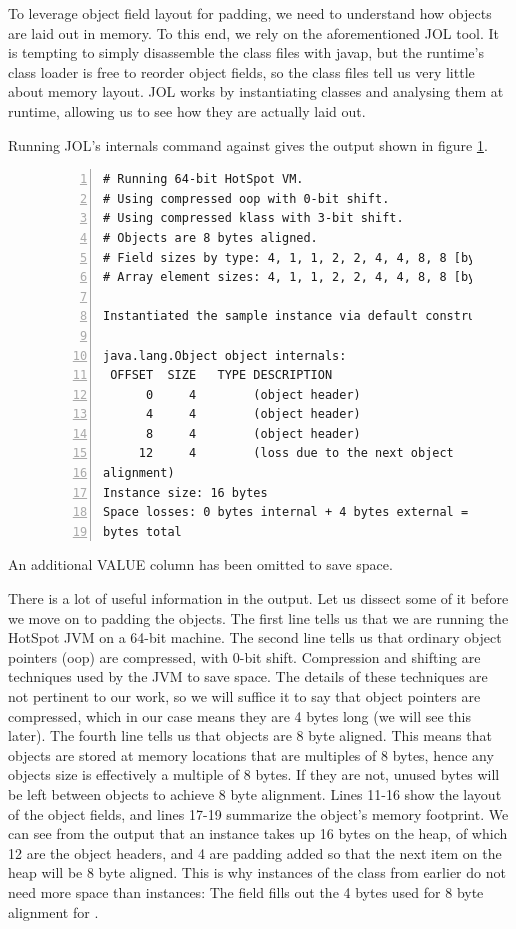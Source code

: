 To leverage object field layout for padding, we need to understand how
objects are laid out in memory. To this end, we rely on the aforementioned
JOL tool. It is tempting to simply disassemble the class files with
javap, but
the runtime's class loader is free to reorder object fields, so the class files
tell us very little about memory layout. JOL works by instantiating classes and
analysing them at runtime, allowing us to see how they are actually laid out.

Running JOL's internals command against  gives the
output shown in figure \ref{jol:object}.

\begin{figure}
\begin{Verbatim}[frame=single, numbers=left]
# Running 64-bit HotSpot VM.
# Using compressed oop with 0-bit shift.
# Using compressed klass with 3-bit shift.
# Objects are 8 bytes aligned.
# Field sizes by type: 4, 1, 1, 2, 2, 4, 4, 8, 8 [bytes]
# Array element sizes: 4, 1, 1, 2, 2, 4, 4, 8, 8 [bytes]

Instantiated the sample instance via default constructor.

java.lang.Object object internals:
 OFFSET  SIZE   TYPE DESCRIPTION
      0     4        (object header)
      4     4        (object header)
      8     4        (object header)
     12     4        (loss due to the next object
alignment)
Instance size: 16 bytes
Space losses: 0 bytes internal + 4 bytes external = 4
bytes total
\end{Verbatim}
	\caption{}
	\label{jol:object}
\end{figure}

An additional VALUE column has been omitted to save space.

There is a lot of useful information in the output. Let us dissect some of it
before we move on to padding the objects.
The first line tells us that we are running the HotSpot JVM on a 64-bit machine.
The second line tells us that ordinary object pointers (oop) are compressed,
with 0-bit shift. Compression and shifting are techniques used by the JVM to
save space. The details of these techniques are not pertinent to our work, so we will suffice
it to say that object pointers are compressed, which in our case means they are 4 bytes long (we will see this later).
The fourth line tells us that objects are 8 byte aligned. This means that
objects are stored at memory locations that are multiples of 8 bytes, hence any
objects size is effectively a multiple of 8 bytes. If they are not, unused
bytes will be left between objects to achieve 8 byte alignment. Lines 11-16 show
the layout of the object fields, and lines 17-19 summarize the object's memory
footprint. We can see from the output that an  instance takes up 16
bytes on the heap, of which 12 are the object headers, and 4 are padding added
so that the next item on the heap will be 8 byte aligned. This is why instances
of the  class from earlier do not need more space than
 instances: The  field fills out the 4 bytes used for 8 byte
alignment for .

